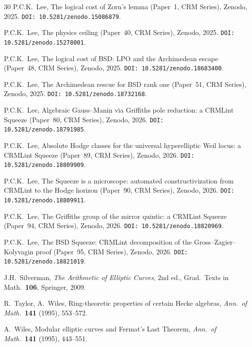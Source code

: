 \documentclass[11pt]{article}
\theoremstyle{plain}
\theoremstyle{definition}
\theoremstyle{remark}
\begin{document}
\begin{thebibliography}{30}
P.C.K.~Lee,
The logical cost of Zorn's lemma (Paper~1, CRM Series),
Zenodo, 2025. \texttt{DOI: 10.5281/zenodo.15086879}.

P.C.K.~Lee,
The physics ceiling (Paper~40, CRM Series),
Zenodo, 2025. \texttt{DOI: 10.5281/zenodo.15278001}.

P.C.K.~Lee,
The logical cost of BSD: LPO and the Archimedean escape (Paper~48, CRM Series),
Zenodo, 2025. \texttt{DOI: 10.5281/zenodo.18683400}.

P.C.K.~Lee,
The Archimedean rescue for BSD rank one (Paper~51, CRM Series),
Zenodo, 2025. \texttt{DOI: 10.5281/zenodo.18732168}.

P.C.K.~Lee,
Algebraic Gauss--Manin via Griffiths pole reduction: a CRMLint Squeeze (Paper~80, CRM Series),
Zenodo, 2026. \texttt{DOI: 10.5281/zenodo.18791985}.

P.C.K.~Lee,
Absolute Hodge classes for the universal hyperelliptic Weil locus: a CRMLint Squeeze (Paper~89, CRM Series),
Zenodo, 2026. \texttt{DOI: 10.5281/zenodo.18809909}.

P.C.K.~Lee,
The Squeeze is a microscope: automated constructivization from CRMLint to the Hodge horizon (Paper~90, CRM Series),
Zenodo, 2026. \texttt{DOI: 10.5281/zenodo.18809911}.

P.C.K.~Lee,
The Griffiths group of the mirror quintic: a CRMLint Squeeze (Paper~94, CRM Series),
Zenodo, 2026. \texttt{DOI: 10.5281/zenodo.18820969}.

P.C.K.~Lee,
The BSD Squeeze: CRMLint decomposition of the Gross--Zagier--Kolyvagin proof (Paper~95, CRM Series),
Zenodo, 2026. \texttt{DOI: 10.5281/zenodo.18821019}.

J.H.~Silverman,
\emph{The Arithmetic of Elliptic Curves}, 2nd ed.,
Grad.\ Texts in Math.\ \textbf{106}, Springer, 2009.

R.~Taylor, A.~Wiles,
Ring-theoretic properties of certain Hecke algebras,
\emph{Ann.\ of Math.}\ \textbf{141} (1995), 553--572.

A.~Wiles,
Modular elliptic curves and Fermat's Last Theorem,
\emph{Ann.\ of Math.}\ \textbf{141} (1995), 443--551.

\end{thebibliography}
\end{document}
